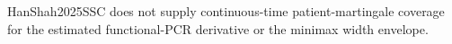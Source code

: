 HanShah2025SSC does not supply continuous-time patient-martingale coverage for the estimated functional-PCR derivative or the minimax width envelope.